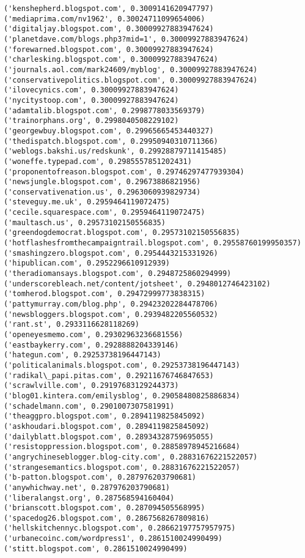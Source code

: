 \documentclass[11pt]{article}
\begin{document}
\begin{Verbatim}[commandchars=\\\{\}]
('kenshepherd.blogspot.com', 0.3009141620947797)
('mediaprima.com/nv1962', 0.30024711099654006)
('digitaljay.blogspot.com', 0.30009927883947624)
('planetdave.com/blogs.php3?mid=1', 0.30009927883947624)
('forewarned.blogspot.com', 0.30009927883947624)
('charlesking.blogspot.com', 0.30009927883947624)
('journals.aol.com/mark24609/myblog', 0.30009927883947624)
('conservativepolitics.blogspot.com', 0.30009927883947624)
('ilovecynics.com', 0.30009927883947624)
('nycitystoop.com', 0.30009927883947624)
('adamtalib.blogspot.com', 0.2998778033569379)
('trainorphans.org', 0.2998040508229102)
('georgewbuy.blogspot.com', 0.29965665453440327)
('thedispatch.blogspot.com', 0.29950940310711366)
('weblogs.bakshi.us/redskunk', 0.29928879711415485)
('woneffe.typepad.com', 0.2985557851202431)
('proponentofreason.blogspot.com', 0.29746297477939304)
('newsjungle.blogspot.com', 0.29673886821956)
('conservativenation.us', 0.2963060939829734)
('steveguy.me.uk', 0.2959464119072475)
('cecile.squarespace.com', 0.2959464119072475)
('maultasch.us', 0.29573102150556835)
('greendogdemocrat.blogspot.com', 0.29573102150556835)
('hotflashesfromthecampaigntrail.blogspot.com', 0.29558760199950357)
('smashingzero.blogspot.com', 0.2954443215331926)
('hipublican.com', 0.2952296610912939)
('theradiomansays.blogspot.com', 0.2948725860294999)
('underscorebleach.net/content/jotsheet', 0.2948012746423102)
('tomherod.blogspot.com', 0.29472999773838315)
('pattymurray.com/blog.php', 0.29423202284478706)
('newsbloggers.blogspot.com', 0.2939482205560532)
('rant.st', 0.2933116628118269)
('openeyesmemo.com', 0.29302963236681556)
('eastbaykerry.com', 0.2928888204339146)
('hategun.com', 0.29253738196447143)
('politicalanimals.blogspot.com', 0.29253738196447143)
('radikal\_papi.pitas.com', 0.29211676746847653)
('scrawlville.com', 0.29197683129244373)
('blog01.kintera.com/emilysblog', 0.29058480825886834)
('schadelmann.com', 0.2901007307581991)
('theaggpro.blogspot.com', 0.2894119825845092)
('askhoudari.blogspot.com', 0.2894119825845092)
('dailyblatt.blogspot.com', 0.28934328759695055)
('resistoppression.blogspot.com', 0.28858978945216684)
('angrychineseblogger.blog-city.com', 0.28831676221522057)
('strangesemantics.blogspot.com', 0.28831676221522057)
('b-patton.blogspot.com', 0.287976203790681)
('anywhichway.net', 0.287976203790681)
('liberalangst.org', 0.287568594160404)
('brianscott.blogspot.com', 0.287094505568995)
('spacedog26.blogspot.com', 0.2867568267809816)
('hellskitchennyc.blogspot.com', 0.28662197757957975)
('urbanecoinc.com/wordpress1', 0.2861510024990499)
('stitt.blogspot.com', 0.2861510024990499)

\end{Verbatim}
\end{document}

